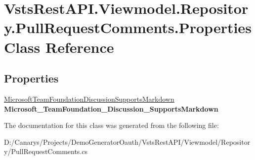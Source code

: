 \hypertarget{class_vsts_rest_a_p_i_1_1_viewmodel_1_1_repository_1_1_pull_request_comments_1_1_properties}{}\section{Vsts\+Rest\+A\+P\+I.\+Viewmodel.\+Repository.\+Pull\+Request\+Comments.\+Properties Class Reference}
\label{class_vsts_rest_a_p_i_1_1_viewmodel_1_1_repository_1_1_pull_request_comments_1_1_properties}
\subsection*{Properties}
\begin{DoxyCompactItemize}
\item 
\mbox{\label{class_vsts_rest_a_p_i_1_1_viewmodel_1_1_repository_1_1_pull_request_comments_1_1_properties_a37d6460fa9070227bd5ea96442f944a6}} 
\mbox{\hyperlink{class_vsts_rest_a_p_i_1_1_viewmodel_1_1_repository_1_1_pull_request_comments_1_1_microsoft_team_cdef9adbd80bdee012c89b0dd9ec0a8e}{Microsoft\+Team\+Foundation\+Discussion\+Supports\+Markdown}} {\bfseries Microsoft\+\_\+\+Team\+Foundation\+\_\+\+Discussion\+\_\+\+Supports\+Markdown}
\end{DoxyCompactItemize}


The documentation for this class was generated from the following file\+:\begin{DoxyCompactItemize}
\item 
D\+:/\+Canarys/\+Projects/\+Demo\+Generator\+Oauth/\+Vsts\+Rest\+A\+P\+I/\+Viewmodel/\+Repository/Pull\+Request\+Comments.\+cs\end{DoxyCompactItemize}

